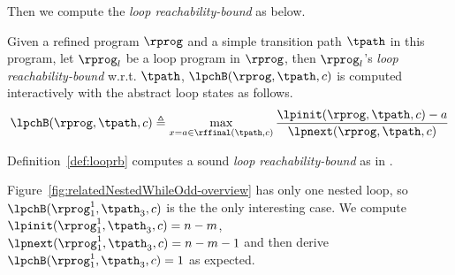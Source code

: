 %
Then we compute the
\emph{loop reachability-bound} as below.
\begin{defn}
 \label{def:looprb}
 Given a refined program $\rprog$ and a simple transition path $\tpath$ in this program, 
 let $\rprog_l$ be a loop program in $\rprog$,
 then $\rprog_l$'s \emph{loop reachability-bound} w.r.t. $\tpath$, $\lpchB(\rprog, \tpath, c)$
 is computed interactively with the abstract loop states as follows. 
 \[
 \lpchB(\rprog, \tpath, c) \triangleq
 \max\limits_{x = a \in \rffinal(\tpath, c)}
 \frac{\lpinit(\rprog, \tpath, c) - a }{\lpnext(\rprog, \tpath, c)}
 \]
\end{defn}
%
Definition~\ref{def:looprb} computes a sound \emph{loop reachability-bound} as in .
%


Figure~\ref{fig:relatedNestedWhileOdd-overview} has only one nested loop, so $\lpchB(\rprog_1^1, \tpath_3, c)$ is the 
the only interesting case.
We compute $\lpinit(\rprog_1^1, \tpath_3, c) = n - m $,
$\lpnext(\rprog_1^1, \tpath_3, c) = n - m - 1$ and then derive $\lpchB(\rprog_1^1, \tpath_3, c) = 1$ as expected.

